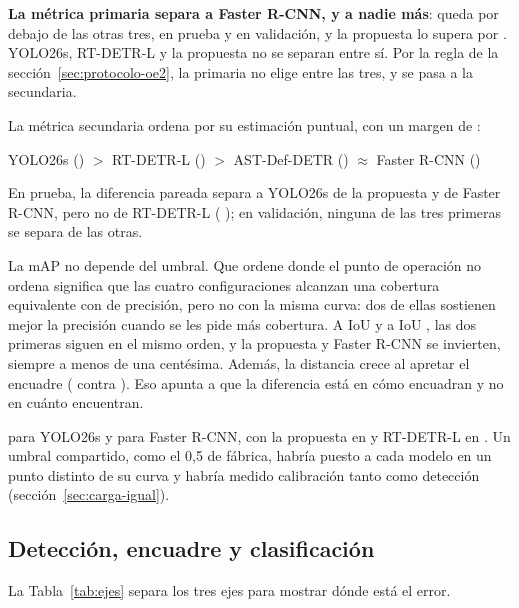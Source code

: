 \textbf{La métrica primaria separa a Faster R-CNN, y a nadie más}: queda por
debajo de las otras tres, en prueba y en validación, y la propuesta lo supera por
\rDrecTestDetFrc{} \rDrecTestDetFrcCi{}. YOLO26s, RT-DETR-L y la propuesta no
se separan entre sí. Por la regla de la sección~\ref{sec:protocolo-oe2}, la
primaria no elige entre las tres, y se pasa a la secundaria.

La métrica secundaria ordena por su estimación puntual, con un margen de
\rMapSpread{}:

\begin{center}
    YOLO26s (\rMapYol{}) $>$ RT-DETR-L (\rMapRtd{}) $>$
    AST-Def-DETR (\rMapDet{}) $\approx$ Faster R-CNN (\rMapFrc{})
\end{center}

En prueba, la diferencia pareada separa a YOLO26s de la propuesta y de Faster
R-CNN, pero no de RT-DETR-L (\rDmapTestYolRtd{} \rDmapTestYolRtdCi{}); en
validación, ninguna de las tres primeras se separa de las otras.

La mAP no depende del umbral. Que ordene donde el punto de operación no ordena
significa que las cuatro configuraciones alcanzan una cobertura equivalente con
\pMinPrecision{} de precisión, pero no con la misma curva: dos de ellas sostienen
mejor la precisión cuando se les pide más cobertura. A IoU \pLooseIou{} y a IoU
\pStrictIou{}, las dos primeras siguen en el mismo orden, y la propuesta y Faster
R-CNN se invierten, siempre a menos de una centésima. Además, la distancia crece
al apretar el encuadre (\rMapStrictYol{} contra \rMapStrictDet{}). Eso apunta a
que la diferencia está en cómo encuadran y no en cuánto encuentran.

 \rThresholdYol{} para
YOLO26s y \rThresholdFrc{} para Faster R-CNN, con la propuesta en
\rThresholdDet{} y RT-DETR-L en \rThresholdRtd{}. Un umbral compartido, como el
0,5 de fábrica, habría puesto a cada modelo en un punto distinto de su curva y
habría medido calibración tanto como detección
(sección~\ref{sec:carga-igual}).

\subsection{Detección, encuadre y clasificación}
\label{sec:ejes}

La Tabla~\ref{tab:ejes} separa los tres ejes para mostrar dónde está el error.

